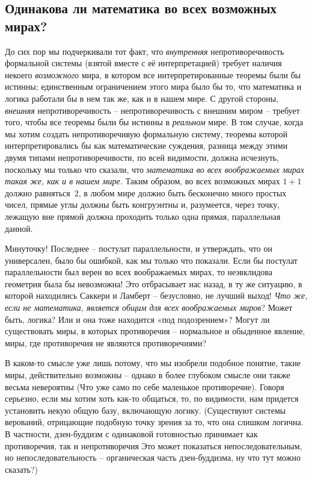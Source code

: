 \documentclass[../main.tex]{subfiles}
\begin{document}
\subsection{Одинакова ли математика во всех возможных мирах?}

До сих пор мы подчеркивали тот факт, что \emph{внутренняя} непротиворечивость формальной системы (взятой вместе с её интерпретацией) требует наличия некоего \emph{возможного} мира, в котором все интерпретированные теоремы были бы истинны; единственным ограничением этого мира было бы то, что математика и логика работали бы в нем так же, как и в нашем мире. С другой стороны, \emph{внешняя} непротиворечивость \--- непротиворечивость с внешним миром \--- требует того, чтобы все теоремы были бы истинны в \emph{реальном} мире. В том случае, когда мы хотим создать непротиворечивую формальную систему, теоремы которой интерпретировались бы как математические суждения, разница между этими двумя типами непротиворечивости, по всей видимости, должна исчезнуть, поскольку мы только что сказали, что \emph{математика во всех воображаемых мирах такая же, как и в нашем мире.} Таким образом, во всех возможных мирах $1 + 1$ должно равняться~$2$, в любом мире должно быть бесконечно много простых чисел, прямые углы должны быть конгруэнтны и, разумеется, через точку, лежащую вне прямой должна проходить только одна прямая, параллельная данной.

Минуточку! Последнее \--- постулат параллельности, и утверждать, что он универсален, было бы ошибкой, как мы только что показали. Если бы постулат параллельности был верен во всех воображаемых мирах, то неэвклидова геометрия была бы невозможна! Это отбрасывает нас назад, в ту же ситуацию, в которой находились Саккери и Ламберт \--- безусловно, не лучший выход! \emph{Что же, если не математика, является общим для всех воображаемых миров}? Может быть, логика? Или и она тоже находится «под подозрением»? Могут ли существовать миры, в которых противоречия \--- нормальное и обыденное явление, миры, где противоречия не являются противоречиями?

В каком-то смысле уже лишь потому, что мы изобрели подобное понятие, такие миры, действительно возможны \--- однако в более глубоком смысле они также весьма невероятны (Что уже само по себе маленькое противоречие). Говоря серьезно, если мы хотим хоть как-то общаться, то, по видимости, нам придется установить некую общую базу, включающую логику. (Существуют системы верований, отрицающие подобную точку зрения за то, что она слишком логична. В частности, дзен-буддизм с одинаковой готовностью принимает как противоречия, так и непротиворечия Это может показаться непоследовательным, но непоследовательность \--- органическая часть дзен-буддизма, ну что тут можно сказать?)
\end{document}
